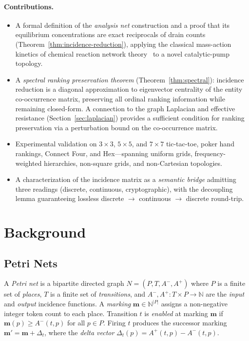 \documentclass[11pt,a4paper]{article}
\newcommand{\N}{\mathbb{N}}
\begin{document}
\paragraph{Contributions.}
\begin{itemize}
  \item A formal definition of the \emph{analysis net} construction and a proof that its equilibrium concentrations are exact reciprocals of drain counts (Theorem~\ref{thm:incidence-reduction}), applying the classical mass-action kinetics of chemical reaction network theory~\cite{horn1972,feinberg2019} to a novel catalytic-pump topology.
  \item A \emph{spectral ranking preservation theorem} (Theorem~\ref{thm:spectral}): incidence reduction is a diagonal approximation to eigenvector centrality of the entity co-occurrence matrix, preserving all ordinal ranking information while remaining closed-form.  A connection to the graph Laplacian and effective resistance (Section~\ref{sec:laplacian}) provides a sufficient condition for ranking preservation via a perturbation bound on the co-occurrence matrix.
  \item Experimental validation on $3 \times 3$, $5 \times 5$, and $7 \times 7$ tic-tac-toe, poker hand rankings, Connect Four, and Hex---spanning uniform grids, frequency-weighted hierarchies, non-square grids, and non-Cartesian topologies.
  \item A characterization of the incidence matrix as a \emph{semantic bridge} admitting three readings (discrete, continuous, cryptographic), with the decoupling lemma guaranteeing lossless discrete $\to$ continuous $\to$ discrete round-trip.
\end{itemize}

\section{Background}
\label{sec:background}

\subsection{Petri Nets}

A \emph{Petri net} is a bipartite directed graph $N = (P, T, A^-, A^+)$ where $P$ is a finite set of \emph{places}, $T$ is a finite set of \emph{transitions}, and $A^-, A^+ : T \times P \to \N$ are the \emph{input} and \emph{output} incidence functions.
A \emph{marking} $\mathbf{m} \in \N^{|P|}$ assigns a non-negative integer token count to each place.
Transition $t$ is \emph{enabled} at marking $\mathbf{m}$ if $\mathbf{m}(p) \geq A^-(t, p)$ for all $p \in P$.
Firing $t$ produces the successor marking $\mathbf{m}' = \mathbf{m} + \Delta_t$, where the \emph{delta vector} $\Delta_t(p) = A^+(t, p) - A^-(t, p)$.
\end{document}
